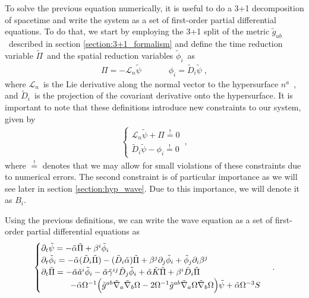 To solve the previous equation numerically, it is useful to do a 3+1 decomposition of spacetime and write the system as a set of first-order partial differential equations. To do that, we start by employing the 3+1 split of the metric $\tilde{g}_{ab}$~described in section \ref{section:3+1_formalism} and define the time reduction variable $\tilde{\Pi}$~and the spatial reduction variables $\tilde{\phi}_i$~as
%
\begin{align}
    \Pi = - \mathcal{L}_n \tilde{\psi} \;  \quad \quad \quad \phi_i = \tilde{D}_i \tilde{\psi} \; ,
\end{align}
%
where $\mathcal{L}_n$~is the Lie derivative along the normal vector to the hypersurface $n^a$~, and $\tilde{D}_i$~is the projection of the covariant derivative onto the hypersurface. It is important to note that these definitions introduce new constraints to our system, given by
%
\begin{align}
    \begin{cases}
        \mathcal{L}_n \tilde{\psi} + \Pi \overset{!}{=} 0 \\
        \tilde{D}_i \tilde{\psi} - \phi_i \overset{!}{=} 0
    \end{cases}\,,
\end{align}
%
where $\overset{!}{=}$ denotes that we may allow for small violations of these constraints due to numerical errors. The second constraint is of particular importance as we will see later in section \ref{section:hyp_wave}. Due to this importance, we will denote it as $B_i$.

Using the previous definitions, we can write the wave equation as a set of first-order partial differential equations as
%
\begin{align}
    \begin{cases}
        \partial_t \tilde{\psi} = - \tilde{\alpha} \tilde{\Pi} + \beta^i \tilde{\phi}_i \\
        \partial_t \tilde{\phi}_i = - \tilde{\alpha} (\tilde{D}_i \tilde{\Pi}) - (\tilde{D}_i \tilde{\alpha}) \tilde{\Pi} + \beta^j \partial_j \tilde{\phi}_i + \tilde{\phi}_j \partial_i \beta^j \\
        \partial_t \tilde{\Pi} = - \tilde{\alpha} \tilde{a}^i \tilde{\phi}_i - \tilde{\alpha} \tilde{\gamma}^{ij} \tilde{D}_j \tilde{\phi}_i + \tilde{\alpha} \tilde{K} \tilde{\Pi} + \beta^i \tilde{D}_i \tilde{\Pi} \\
        \hspace{3.5em} - \tilde{\alpha} \Omega^{-1} \Big( \tilde{g}^{ab} \tilde{\nabla}_a \tilde{\nabla}_b \Omega - 2 \Omega^{-1} \tilde{g}^{ab} \tilde{\nabla}_a \Omega \tilde{\nabla}_b \Omega \Big) \tilde{\psi} + \tilde{\alpha} \Omega^{-3} S
    \end{cases}\,.
    \label{eq:wave_equation_3+1}
\end{align}

